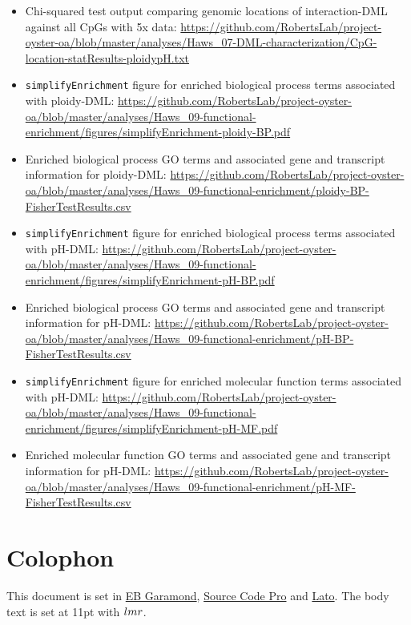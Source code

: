 \documentclass [11pt, proquest] {uwthesis}[2015/03/03]
\begin{document}
\begin{itemize}
\item
  Chi-squared test output comparing genomic locations of interaction-DML against all CpGs with 5x data: \url{https://github.com/RobertsLab/project-oyster-oa/blob/master/analyses/Haws_07-DML-characterization/CpG-location-statResults-ploidypH.txt}
\item
  \texttt{simplifyEnrichment} figure for enriched biological process terms associated with ploidy-DML: \url{https://github.com/RobertsLab/project-oyster-oa/blob/master/analyses/Haws_09-functional-enrichment/figures/simplifyEnrichment-ploidy-BP.pdf}
\item
  Enriched biological process GO terms and associated gene and transcript information for ploidy-DML: \url{https://github.com/RobertsLab/project-oyster-oa/blob/master/analyses/Haws_09-functional-enrichment/ploidy-BP-FisherTestResults.csv}
\item
  \texttt{simplifyEnrichment} figure for enriched biological process terms associated with pH-DML: \url{https://github.com/RobertsLab/project-oyster-oa/blob/master/analyses/Haws_09-functional-enrichment/figures/simplifyEnrichment-pH-BP.pdf}
\item
  Enriched biological process GO terms and associated gene and transcript information for pH-DML: \url{https://github.com/RobertsLab/project-oyster-oa/blob/master/analyses/Haws_09-functional-enrichment/pH-BP-FisherTestResults.csv}
\item
  \texttt{simplifyEnrichment} figure for enriched molecular function terms associated with pH-DML: \url{https://github.com/RobertsLab/project-oyster-oa/blob/master/analyses/Haws_09-functional-enrichment/figures/simplifyEnrichment-pH-MF.pdf}
\item
  Enriched molecular function GO terms and associated gene and transcript information for pH-DML: \url{https://github.com/RobertsLab/project-oyster-oa/blob/master/analyses/Haws_09-functional-enrichment/pH-MF-FisherTestResults.csv}
\end{itemize}
\hypertarget{colophon}{%
\chapter*{Colophon}\label{colophon}}

This document is set in \href{https://github.com/georgd/EB-Garamond}{EB Garamond}, \href{https://github.com/adobe-fonts/source-code-pro/}{Source Code Pro} and \href{http://www.latofonts.com/lato-free-fonts/}{Lato}. The body text is set at 11pt with \(\familydefault\).
\end{document}
